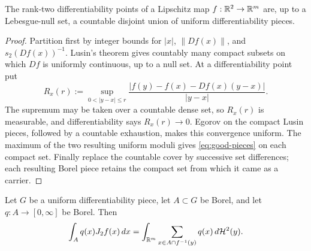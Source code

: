 \begin{lemma}
\label{lem:good-pieces-exhaust}
The rank-two differentiability points of a Lipschitz map
$f:\mathbb R^2\to\mathbb R^m$ are, up to a Lebesgue-null set, a countable disjoint union
of uniform differentiability pieces.
\end{lemma}

\begin{proof}
Partition first by integer bounds for $|x|$, $\|Df(x)\|$, and
$s_2(Df(x))^{-1}$.  Lusin's theorem gives countably many compact subsets on
which $Df$ is uniformly continuous, up to a null set.  At a differentiability
point put
\[
 R_x(r):=\sup_{0<|y-x|\le r}
 \frac{|f(y)-f(x)-Df(x)(y-x)|}{|y-x|}.
\]
The supremum may be taken over a countable dense set, so $R_x(r)$ is
measurable, and differentiability says $R_x(r)\to0$.  Egorov on the compact
Lusin pieces, followed by a countable exhaustion, makes this convergence
uniform.  The maximum of the two resulting uniform moduli gives
\eqref{eq:good-pieces} on each compact set.  Finally replace the countable
cover by successive set differences; each resulting Borel piece retains the
compact set from which it came as a carrier.
\end{proof}

\begin{lemma}\label{lem:area-one-piece}
Let $G$ be a uniform differentiability piece, let $A\subset G$ be Borel, and
let $q:A\to[0,\infty]$ be Borel.  Then
\begin{equation}\label{eq:area-one-piece}
  \int_Aq(x)J_2f(x)\,dx
  =\int_{\mathbb R^m}\sum_{x\in A\cap f^{-1}(y)}q(x)\,d\mathcal H^2(y).
\end{equation}
\end{lemma}

